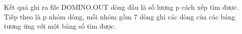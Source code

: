 Kết quả ghi ra file DOMINO.OUT dòng đầu là số lượng p cách xếp tìm được. Tiếp theo là p nhóm dòng, mỗi nhóm gồm 7 dòng ghi các dòng của các bảng tương ứng với một bảng số tìm được.